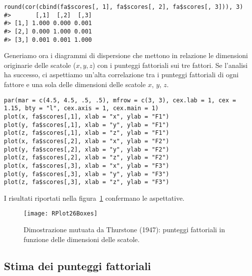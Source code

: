 \begin{lstlisting}
round(cor(cbind(fa$scores[, 1], fa$scores[, 2], fa$scores[, 3])), 3)
#>       [,1]  [,2]  [,3]
#> [1,] 1.000 0.000 0.001
#> [2,] 0.000 1.000 0.001
#> [3,] 0.001 0.001 1.000
\end{lstlisting}
Generiamo ora i diagrammi di dispersione che mettono in relazione le dimensioni originarie delle scatole ($x, y, z$) con i punteggi fattoriali sui tre fattori. 
Se l'analisi ha successo, ci aspettiamo un'alta correlazione tra i punteggi fattoriali
di ogni fattore e una sola delle dimensioni delle scatole $x$, $y$, $z$.

\begin{lstlisting}
par(mar = c(4.5, 4.5, .5, .5), mfrow = c(3, 3), cex.lab = 1, cex = 1.15, bty = "l", cex.axis = 1, cex.main = 1)  
plot(x, fa$scores[,1], xlab = "x", ylab = "F1")
plot(y, fa$scores[,1], xlab = "y", ylab = "F1")
plot(z, fa$scores[,1], xlab = "z", ylab = "F1")
plot(x, fa$scores[,2], xlab = "x", ylab = "F2")
plot(y, fa$scores[,2], xlab = "y", ylab = "F2")
plot(z, fa$scores[,2], xlab = "z", ylab = "F2")
plot(x, fa$scores[,3], xlab = "x", ylab = "F3")
plot(y, fa$scores[,3], xlab = "y", ylab = "F3")
plot(z, fa$scores[,3], xlab = "z", ylab = "F3")
\end{lstlisting}
I risultati riportati nella figura~\ref{fig:26boxes} confermano le aspettative.

\begin{figure}
  \begin{center}
    \texttt{[image: RPlot26Boxes]}
    \caption{Dimostrazione mutuata da Thurstone (1947): punteggi
        fattoriali in funzione delle dimensioni delle scatole.}
    \label{fig:26boxes}
  \end{center}
\end{figure}


\subsection{Stima dei punteggi fattoriali}


